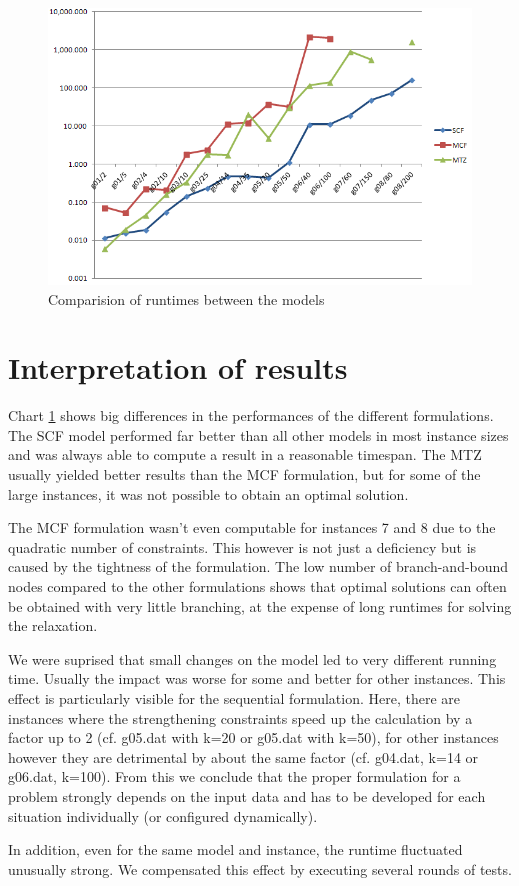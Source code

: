 \documentclass[,%
			paper=a4,%
			DIV14,
			liststotoc,
			bibtotoc,
			draft=false,%
			numbers=noendperiod
			]{scrartcl}
\begin{document}
\begin{figure}[htpb]
	\centering	\includegraphics[width=1.00\textwidth]{chart.png}
	\caption{Comparision of runtimes between the models}
	\label{fig:chart}
\end{figure}


\section{Interpretation of results}
Chart \ref{fig:chart} shows big differences in the performances of the different formulations. The SCF model performed far better than all other models in most instance sizes and was always able to compute a result in a reasonable timespan. The MTZ usually yielded better results than the MCF formulation, but for some of the large instances, it was not possible to obtain an optimal solution.

The MCF formulation wasn't even computable for instances 7 and 8 due to the quadratic number of constraints.
This however is not just a deficiency but is caused by the tightness of the formulation.
The low number of branch-and-bound nodes compared to the other formulations shows that optimal solutions can often be obtained with very little branching, at the expense of long runtimes for solving the relaxation.

We were suprised that small changes on the model led to very different running time. Usually the impact was worse for some and better for other instances.
This effect is particularly visible for the sequential formulation. Here, there are instances where the strengthening constraints speed up the calculation by a factor up to 2 (cf. g05.dat with k=20 or g05.dat with k=50), for other instances however they are detrimental by about the same factor (cf. g04.dat, k=14 or g06.dat, k=100).
From this we conclude that the proper formulation for a problem strongly depends on the input data and has to be developed for each situation individually (or configured dynamically).


In addition, even for the same model and instance, the runtime fluctuated unusually strong.
We compensated this effect by executing several rounds of tests.
\end{document}
